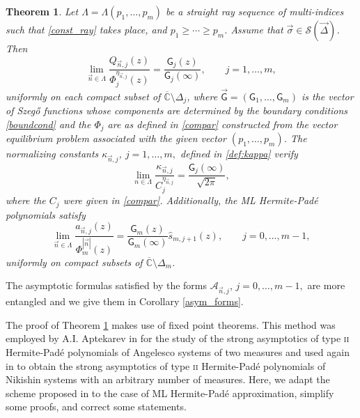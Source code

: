 \documentclass{amsart}
\numberwithin{equation}{section}
\newtheorem{theorem}{Theorem}[section]
\theoremstyle{definition}
\newcommand{\CC}{\mathbb{C}}      %
\newcommand{\n}{\vec{n}}          %
\begin{document}
    \begin{theorem}
        \label{th1}
        Let $\Lambda = \Lambda(p_1,\ldots,p_m)$ be a straight ray sequence of multi-indices such that \eqref{const_ray} takes place,  and $p_1 \geq \cdots \geq p_m$. Assume that $\vec{\sigma} \in \mathcal{S}(\vec{\Delta})$.
        Then
        \begin{equation}
 		\label{limfund***}
 		\lim_{\n\in\Lambda} \frac{Q_{\n,j}(z)}{\Phi_j^{\eta_{\n,j}}(z)} = \frac{\mathsf{G}_j(z)}{\mathsf{G}_j(\infty)}, \qquad j=1,\ldots,m,
 	\end{equation}
        uniformly on each compact subset of $\overline{\CC} \setminus \Delta_j$,  where $\vec{\mathsf{G}} = (\mathsf{G}_1,\ldots,\mathsf{G}_m)$ is the vector of Szeg\H{o} functions whose components are determined by the boundary conditions  \eqref{boundcond} and the $\Phi_j$ are as defined in \eqref{compar} constructed from the vector equilibrium problem associated with the given vector $(p_1,\ldots,p_m)$. The normalizing constants $\kappa_{\n,j}$, $j=1,\ldots,m,$  defined in \eqref{def:kappa} verify
        \begin{equation}
        	\label{kappas}
        	\lim_{n \in \Lambda} \frac{\kappa_{\n,j}}{C_j^{\eta_{\n,j}}} = \frac{\mathsf{G}_j(\infty)}{\sqrt{2\pi}},
        \end{equation}
        where the $C_j$ were given in \eqref{compar}. Additionally, the ML Hermite-Pad\'e polynomials satisfy
        	\begin{equation}
        		\label{MLasin}
        		\lim_{\n\in\Lambda} \frac{a_{\n,j}(z)}{\Phi_m^{|\n|}(z)} = \frac{\mathsf{G}_m(z)}{\mathsf{G}_m(\infty)}\widehat{s}_{m,j+1}(z), \qquad j=0,\ldots,m-1,
	\end{equation}
	 uniformly on compact subsets of $\overline{\CC} \setminus \Delta_m$.
    \end{theorem}

    The asymptotic formulas satisfied by the forms $\mathcal{A}_{\n,j}$, $j=0,\ldots,m-1,$ are more entangled and we give them in Corollary \ref{asym_forms}.

    The proof of Theorem \ref{th1} makes use of fixed point theorems. This method was employed by A.I. Aptekarev in  \cite{sasha89} for the study of the strong asymptotics of type \textsc{ii} Hermite-Pad\'e polynomials of Angelesco systems of two measures and used again in \cite{sasha99}   to obtain the strong asymptotics of type \textsc{ii} Hermite-Pad\'e polynomials of Nikishin systems with an arbitrary number of measures. Here, we adapt the scheme proposed in \cite{sasha99}  to the case of ML Hermite-Pad\'e approximation, simplify some proofs, and correct some statements.
\end{document}
